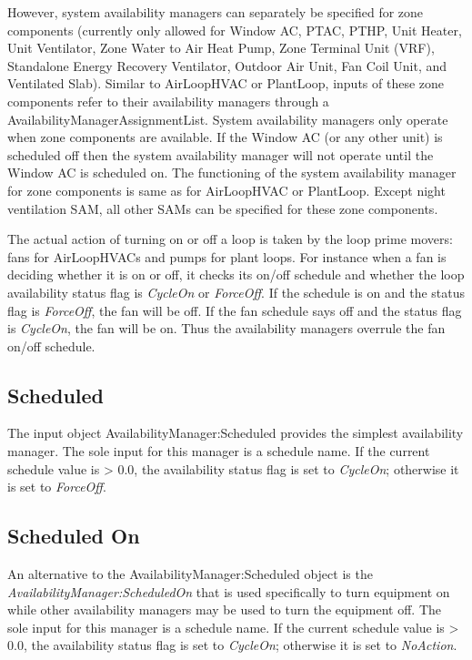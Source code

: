 However, system availability managers can separately be specified for zone components (currently only allowed for Window AC, PTAC, PTHP, Unit Heater, Unit Ventilator, Zone Water to Air Heat Pump, Zone Terminal Unit (VRF), Standalone Energy Recovery Ventilator, Outdoor Air Unit, Fan Coil Unit, and Ventilated Slab). Similar to AirLoopHVAC or PlantLoop, inputs of these zone components refer to their availability managers through a AvailabilityManagerAssignmentList. System availability managers only operate when zone components are available. If the Window AC (or any other unit) is scheduled off then the system availability manager will not operate until the Window AC is scheduled on. The functioning of the system availability manager for zone components is same as for AirLoopHVAC or PlantLoop. Except night ventilation SAM, all other SAMs can be specified for these zone components.

The actual action of turning on or off a loop is taken by the loop prime movers: fans for AirLoopHVACs and pumps for plant loops. For instance when a fan is deciding whether it is on or off, it checks its on/off schedule and whether the loop availability status flag is \emph{CycleOn} or \emph{ForceOff}. If the schedule is on and the status flag is \emph{ForceOff}, the fan will be off. If the fan schedule says off and the status flag is \emph{CycleOn}, the fan will be on. Thus the availability managers overrule the fan on/off schedule.

\subsection{Scheduled}\label{scheduled-000}

The input object AvailabilityManager:Scheduled provides the simplest availability manager. The sole input for this manager is a schedule name. If the current schedule value is \textgreater{} 0.0, the availability status flag is set to \emph{CycleOn}; otherwise it is set to \emph{ForceOff}.

\subsection{Scheduled On}\label{scheduled-on}

An alternative to the AvailabilityManager:Scheduled object is the \emph{AvailabilityManager:ScheduledOn} that is used specifically to turn equipment on while other availability managers may be used to turn the equipment off. The sole input for this manager is a schedule name. If the current schedule value is \textgreater{} 0.0, the availability status flag is set to \emph{CycleOn}; otherwise it is set to \emph{NoAction}.

